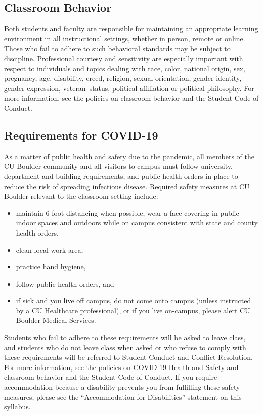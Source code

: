 \documentclass[9pt]{article}
\begin{document}
{\small


    \subsection*{Classroom Behavior}
    Both students and faculty are responsible for maintaining an appropriate learning environment in all instructional settings, whether in person, remote or online. Those who fail to adhere to such behavioral standards may be subject to discipline. Professional courtesy and sensitivity are especially important with respect to individuals and topics dealing with race, color, national origin, sex, pregnancy, age, disability, creed, religion, sexual orientation, gender identity, gender expression, veteran status, political affiliation or political philosophy.  For more information, see the policies on classroom behavior and the Student Code of Conduct. 

    \subsection*{Requirements for COVID-19}

As a matter of public health and safety due to the pandemic, all members of the CU Boulder community and all visitors to campus must follow university, department and building requirements, and public health orders in place to reduce the risk of spreading infectious disease. Required safety measures at CU Boulder relevant to the classroom setting include:

\begin{itemize}
    \item maintain 6-foot distancing when possible,
wear a face covering in public indoor spaces and outdoors while on campus consistent with state and county health orders,
    \item clean local work area,
    \item practice hand hygiene,
    \item follow public health orders, and
    \item if sick and you live off campus, do not come onto campus (unless instructed by a CU Healthcare professional), or if you live on-campus, please alert CU Boulder Medical Services.
\end{itemize}
Students who fail to adhere to these requirements will be asked to leave class, and students who do not leave class when asked or who refuse to comply with these requirements will be referred to Student Conduct and Conflict Resolution. For more information, see the policies on COVID-19 Health and Safety and classroom behavior and the Student Code of Conduct. If you require accommodation because a disability prevents you from fulfilling these safety measures, please see the “Accommodation for Disabilities” statement on this syllabus.\\

}
\end{document}
